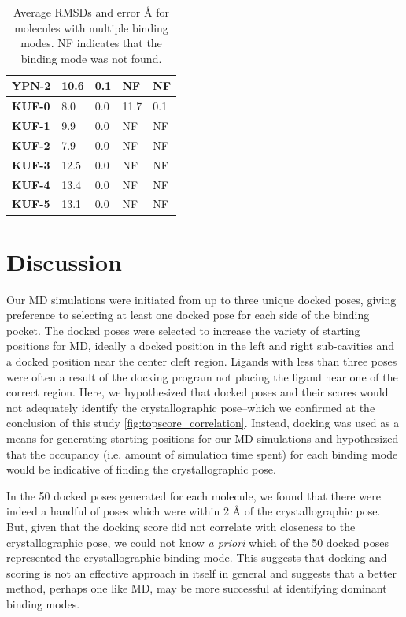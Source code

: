 \begin{table}[]
\begin{tabular}{|l|l|l|l|l|}
\textbf{YPN-2}  & 10.6          & 0.1              & NF          & NF             \\ \hline
\textbf{KUF-0}  & 8.0           & 0.0              & 11.7        & 0.1            \\ \hline
\textbf{KUF-1}  & 9.9           & 0.0              & NF          & NF             \\ \hline
\textbf{KUF-2}  & 7.9           & 0.0              & NF          & NF             \\ \hline
\textbf{KUF-3}  & 12.5          & 0.0              & NF          & NF             \\ \hline
\textbf{KUF-4}  & 13.4          & 0.0              & NF          & NF             \\ \hline
\textbf{KUF-5}  & 13.1          & 0.0              & NF          & NF             \\ \hline
\end{tabular}
\caption[Average RMSDs and error {\AA} for molecules with multiple binding modes.]{Average RMSDs and error {\AA} for molecules with multiple binding modes. NF indicates that the binding mode was not found.}
\label{table:multibm}
\end{table}

\section{Discussion}
Our MD simulations were initiated from up to three unique docked poses, giving preference to selecting at least one docked pose for each side of the binding pocket. 
The docked poses were selected to increase the variety of starting positions for MD, ideally a docked position in the left and right sub-cavities and a docked position near the center cleft region.
Ligands with less than three poses were often a result of the docking program not placing the ligand near one of the correct region. 
Here, we hypothesized that docked poses and their scores would not adequately identify the crystallographic pose--which we confirmed at the conclusion of this study \ref{fig:topscore_correlation}.
Instead, docking was used as a means for generating starting positions for our MD simulations and hypothesized that the occupancy (i.e. amount of simulation time spent) for each binding mode would be indicative of finding the crystallographic pose.

In the 50 docked poses generated for each molecule, we found that there were indeed a handful of poses which were within 2 {\AA} of the crystallographic pose.
But, given that the docking score did not correlate with closeness to the crystallographic pose, we could not know \emph{a priori} which of the 50 docked poses represented the crystallographic binding mode.
This suggests that docking and scoring is not an effective approach in itself in general and suggests that a better method, perhaps one like MD, may be more successful at identifying dominant binding modes.

